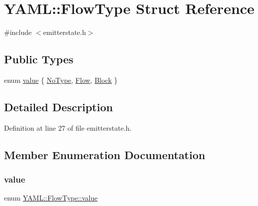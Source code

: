 \hypertarget{struct_y_a_m_l_1_1_flow_type}{}\section{Y\+A\+ML\+::Flow\+Type Struct Reference}
\label{struct_y_a_m_l_1_1_flow_type}


{\ttfamily \#include $<$emitterstate.\+h$>$}

\subsection*{Public Types}
\begin{DoxyCompactItemize}
\item 
enum \mbox{\hyperlink{struct_y_a_m_l_1_1_flow_type_afc7b0fab097e599c9b49918739e1b5cc}{value}} \{ \mbox{\hyperlink{struct_y_a_m_l_1_1_flow_type_afc7b0fab097e599c9b49918739e1b5cca619cfe6c1b5b5ecbf830e5ee00e5be40}{No\+Type}}, 
\mbox{\hyperlink{struct_y_a_m_l_1_1_flow_type_afc7b0fab097e599c9b49918739e1b5cca2978eddb51d8391fd2a937ccdae86dbb}{Flow}}, 
\mbox{\hyperlink{struct_y_a_m_l_1_1_flow_type_afc7b0fab097e599c9b49918739e1b5ccabd51706fa66584fd74c40e7cc62e1dbf}{Block}}
 \}
\end{DoxyCompactItemize}


\subsection{Detailed Description}


Definition at line 27 of file emitterstate.\+h.



\subsection{Member Enumeration Documentation}
\mbox{\label{struct_y_a_m_l_1_1_flow_type_afc7b0fab097e599c9b49918739e1b5cc}} 
\subsubsection{\texorpdfstring{value}{value}}
{\footnotesize\ttfamily enum \mbox{\hyperlink{struct_y_a_m_l_1_1_flow_type_afc7b0fab097e599c9b49918739e1b5cc}{Y\+A\+M\+L\+::\+Flow\+Type\+::value}}}


